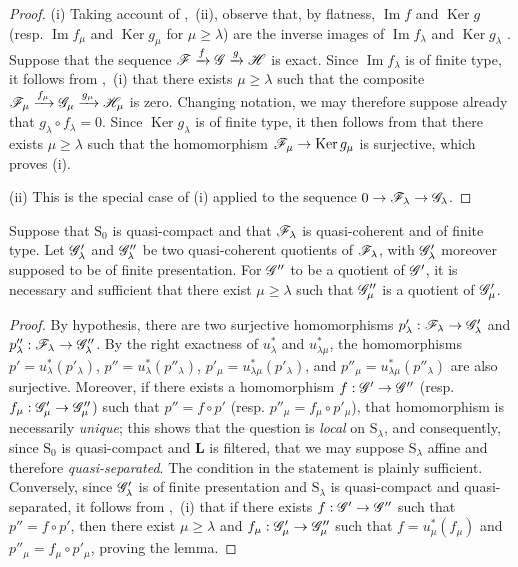 \begin{proof}
(i) Taking account of ,~(ii), observe that, by flatness, $\operatorname{Im} f$ and $\operatorname{Ker} g$ (resp. $\operatorname{Im} f_\mu$ and $\operatorname{Ker} g_\mu$ for $\mu\geqslant\lambda$) are the inverse images of $\operatorname{Im} f_\lambda$ and $\operatorname{Ker} g_\lambda$ . Suppose that the sequence $\mathscr{F}\xrightarrow{f}\mathscr{G}\xrightarrow{g}\mathscr{H}$ is exact. Since $\operatorname{Im} f_\lambda$ is of finite type, it follows from ,~(i) that there exists $\mu\geqslant\lambda$ such that the composite $\mathscr{F}_\mu\xrightarrow{f_\mu}\mathscr{G}_\mu\xrightarrow{g_\mu}\mathscr{H}_\mu$ is zero. Changing notation, we may therefore suppose already that $g_\lambda\circ f_\lambda=0$. Since $\operatorname{Ker} g_\lambda$ is of finite type, it then follows from  that there exists $\mu\geqslant\lambda$ such that the homomorphism $\mathscr{F}_\mu\to\operatorname{Ker} g_\mu$ is surjective, which proves (i).

(ii) This is the special case of (i) applied to the sequence $0\to\mathscr{F}_\lambda\to\mathscr{G}_\lambda$.
\end{proof}

\begin{lemma}[8.5.9]
\label{IV.8.5.9}
Suppose that $\mathrm{S}_0$ is quasi-compact and that $\mathscr{F}_\lambda$ is quasi-coherent and of finite type. Let $\mathscr{G}'_\lambda$ and $\mathscr{G}''_\lambda$ be two quasi-coherent quotients of $\mathscr{F}_\lambda$, with $\mathscr{G}'_\lambda$ moreover supposed to be of finite presentation. For $\mathscr{G}''$ to be a quotient of $\mathscr{G}'$, it is necessary and sufficient that there exist $\mu\geqslant\lambda$ such that $\mathscr{G}''_\mu$ is a quotient of $\mathscr{G}'_\mu$.
\end{lemma}

\begin{proof}
By hypothesis, there are two surjective homomorphisms $p'_\lambda:\mathscr{F}_\lambda\to\mathscr{G}'_\lambda$ and $p''_\lambda:\mathscr{F}_\lambda\to\mathscr{G}''_\lambda$. By the right exactness of $u_\lambda^*$ and $u_{\lambda\mu}^*$, the homomorphisms $p'=u_\lambda^*(p'_\lambda)$, $p''=u_\lambda^*(p''_\lambda)$, $p'_\mu=u_{\lambda\mu}^*(p'_\lambda)$, and $p''_\mu=u_{\lambda\mu}^*(p''_\lambda)$ are also surjective. Moreover, if there exists a homomorphism $f:\mathscr{G}'\to\mathscr{G}''$ (resp. $f_\mu:\mathscr{G}'_\mu\to\mathscr{G}''_\mu$) such that $p''=f\circ p'$ (resp. $p''_\mu=f_\mu\circ p'_\mu$), that homomorphism is necessarily \emph{unique}; this shows that the question is \emph{local} on $\mathrm{S}_\lambda$, and consequently, since $\mathrm{S}_0$ is quasi-compact and $\mathbf{L}$ is filtered, that we may suppose $\mathrm{S}_\lambda$ affine and therefore \emph{quasi-separated}. The condition in the statement is plainly sufficient. Conversely, since $\mathscr{G}'_\lambda$ is of finite presentation and $\mathrm{S}_\lambda$ is quasi-compact and quasi-separated, it follows from ,~(i) that if there exists $f:\mathscr{G}'\to\mathscr{G}''$ such that $p''=f\circ p'$, then there exist $\mu\geqslant\lambda$ and $f_\mu:\mathscr{G}'_\mu\to\mathscr{G}''_\mu$ such that $f=u_\mu^*(f_\mu)$ and $p''_\mu=f_\mu\circ p'_\mu$, proving the lemma.
\end{proof}

